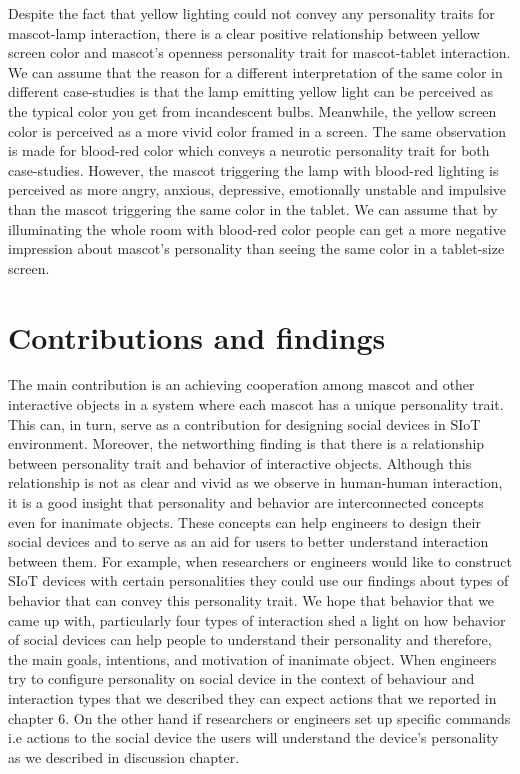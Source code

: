 \par Despite the fact that yellow lighting could not convey any personality traits for
mascot-lamp interaction, there is a clear positive relationship between yellow screen color
and mascot’s openness personality trait for mascot-tablet interaction.
We can assume that the reason for a different interpretation of the same color in different
case-studies is that the lamp emitting yellow light can be perceived as the
typical color you get from incandescent bulbs.
Meanwhile, the yellow screen color is perceived as a more vivid color framed in a screen.
The same observation is made for blood-red color which conveys a neurotic personality trait for both case-studies.
However, the mascot triggering the lamp with blood-red lighting is perceived as
more angry, anxious, depressive, emotionally unstable and impulsive than the
mascot triggering the same color in the tablet.
We can assume that by illuminating the whole room with blood-red color people can
get a more negative impression about mascot’s personality than seeing the same color in a tablet-size screen.

\section{Contributions and findings}
\label{sec:contributions-and-findings}
The main contribution is an achieving cooperation among mascot and other interactive
objects in a system where each mascot has a unique personality trait.
This can, in turn, serve as a contribution for designing social devices in SIoT environment.
Moreover, the networthing finding is that there is a relationship between
personality trait and behavior of interactive objects.
Although this relationship is not as clear and vivid as we observe in human-human interaction,
it is a good insight that personality and behavior are interconnected concepts even for inanimate objects.
These concepts can help engineers to design their social devices and to serve as an
aid for users to better understand interaction between them.
For example, when researchers or engineers would like to construct SIoT devices
with certain personalities they could use our findings about types of behavior that can
convey this personality trait.
We hope that behavior that we came up with, particularly four types of interaction shed
a light on how behavior of social devices can help people to understand their personality and
therefore, the main goals, intentions, and motivation of inanimate object.
When engineers try to configure personality on social device in the context of behaviour and
interaction types that we described they can expect actions that we reported in chapter 6.
On the other hand if researchers or engineers set up specific commands i.e actions to the
social device the users will understand the device's personality as we described in discussion chapter.

